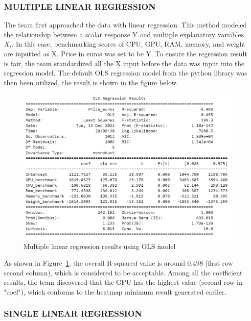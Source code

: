 \documentclass{scrartcl}
\begin{document}
\subsubsection{MULTIPLE LINEAR REGRESSION}

The team first approached the data with linear regression. This method modeled the relationship between a scalar response Y and multiple explanatory variables $X_i$. In this case, benchmarking scores of CPU, GPU, RAM, memory, and weight are inputted as X. Price in euros was set to be Y. To ensure the regression result is fair, the team standardized all the X input before the data was input into the regression model. The default OLS regression model from the python library\cite{chen} was then been utilized, the result is shown in the figure below.

\begin{figure}[H]
	\begin{center}
		\includegraphics[scale=0.6]{Graphics/4520 final/OLS_regression.png}
	\end{center}
	\caption{Multiple linear regression results using OLS model}
	\label{fig:OLS}
\end{figure}

\noindent As shown in Figure~\ref{fig:OLS}, the overall R-squared value is around 0.498 (first row second column), which is considered to be acceptable. Among all the coefficient results, the team discovered that the GPU has the highest value (second row in "coef"), which conforms to the heatmap minimum result generated earlier. 

\subsubsection{SINGLE LINEAR REGRESSION}
\end{document}
